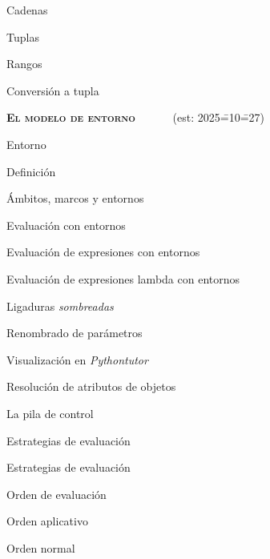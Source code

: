 \begin{longenum}
\begin{longenum}
\begin{longenum}
\begin{longenum}
                \item Cadenas
                \item Tuplas
                \item Rangos
                \item Conversión a tupla
            \end{longenum}
        \end{longenum}
    \end{longenum}
    \item \textbf{\textsc{El modelo de entorno}} \ \ \ \ \ \ (est: 2025\==10\==27)
    \begin{longenum}
        \item Entorno
        \begin{longenum}
            \item Definición
            \item Ámbitos, marcos y entornos
        \end{longenum}
        \item Evaluación con entornos
        \begin{longenum}
            \item Evaluación de expresiones con entornos
            \item Evaluación de expresiones lambda con entornos
            \begin{longenum}
                \item Ligaduras \textit{sombreadas}
                \item Renombrado de parámetros
                \item Visualización en \textit{Pythontutor}
            \end{longenum}
            \item Resolución de atributos de objetos
        \end{longenum}
        \item La pila de control
        \item Estrategias de evaluación \opcional\
        \begin{longenum}
            \item Estrategias de evaluación
            \item Orden de evaluación
            \begin{longenum}
                \item Orden aplicativo
                \item Orden normal
            \end{longenum}

\end{longenum}
\end{longenum}
\end{longenum}
